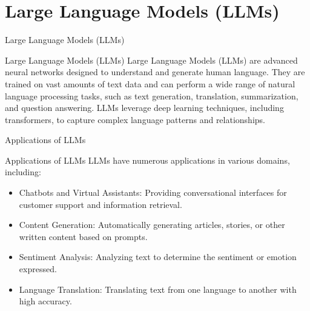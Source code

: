 \documentclass[hyperref={pdfpagelabels=false},aspectratio=169]{beamer}
\begin{document}
\section[LLMs]{Large Language Models (LLMs)}
\label{sec:org532e9ef}
\begin{frame}[label={sec:org0743131}]{Large Language Models (LLMs)}
\begin{block}{Large Language Models (LLMs)}
Large Language Models (LLMs) are advanced neural networks designed to understand and generate human language. They are trained on vast amounts of text data and can perform a wide range of natural language processing tasks, such as text generation, translation, summarization, and question answering. LLMs leverage deep learning techniques, including transformers, to capture complex language patterns and relationships.
\end{block}
\end{frame}
\begin{frame}[label={sec:org4acd5e6}]{Applications of LLMs}
\begin{block}{Applications of LLMs}
LLMs have numerous applications in various domains, including:
\begin{itemize}
\item \alert{Chatbots and Virtual Assistants}: Providing conversational interfaces for customer support and information retrieval.
\item \alert{Content Generation}: Automatically generating articles, stories, or other written content based on prompts.
\item \alert{Sentiment Analysis}: Analyzing text to determine the sentiment or emotion expressed.
\item \alert{Language Translation}: Translating text from one language to another with high accuracy.
\end{itemize}
\end{block}
\end{frame}
\end{document}
